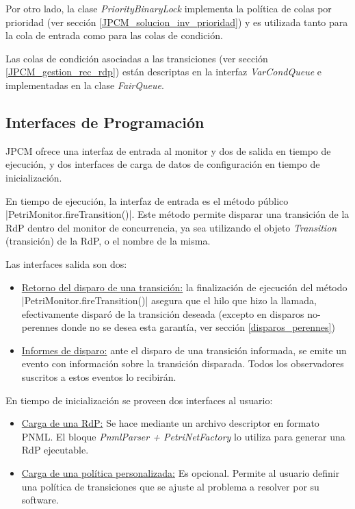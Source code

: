 Por otro lado, la clase \textit{PriorityBinaryLock} implementa la política de
colas por prioridad (ver sección \ref{JPCM_solucion_inv_prioridad}) y es
utilizada tanto para la cola de entrada como para las colas de condición.

Las colas de condición asociadas a las transiciones (ver sección
\ref{JPCM_gestion_rec_rdp}) están descriptas en la interfaz
\textit{VarCondQueue} e implementadas en la clase \textit{FairQueue}.


\subsection{Interfaces de Programación}

JPCM ofrece una interfaz de entrada al monitor y dos de salida en tiempo de
ejecución, y dos interfaces de carga de datos de configuración en tiempo de
inicialización.

En tiempo de ejecución, la interfaz de entrada es el método público 
|PetriMonitor.fireTransition()|. Este método permite disparar una
transición de la RdP dentro del monitor de concurrencia, ya sea utilizando el
objeto \textit{Transition} (transición) de la RdP, o el nombre de la misma.

Las interfaces salida son dos:
\begin{itemize}
  \item \underline{Retorno del disparo de una transición:} la finalización de
  ejecución del método |PetriMonitor.fireTransition()| asegura que el
  hilo que hizo la llamada, efectivamente disparó de la transición deseada
  (excepto en disparos no-perennes donde no se desea esta garantía, ver sección
  \ref{disparos_perennes})
  \item \underline{Informes de disparo:} ante el disparo de una
  transición informada, se emite un evento con información sobre la transición
  disparada. Todos los observadores suscritos a estos eventos lo recibirán.
\end{itemize}

En tiempo de inicialización se proveen dos interfaces al usuario:
\begin{itemize} 
  \item \underline{Carga de una RdP:} Se hace mediante un archivo descriptor
  en formato PNML. El bloque \textit{PnmlParser + PetriNetFactory} lo utiliza
  para generar una RdP ejecutable.
  \item \underline{Carga de una política personalizada:} Es opcional. Permite
  al usuario definir una política de transiciones que se ajuste al problema a
  resolver por su software.
\end{itemize}

